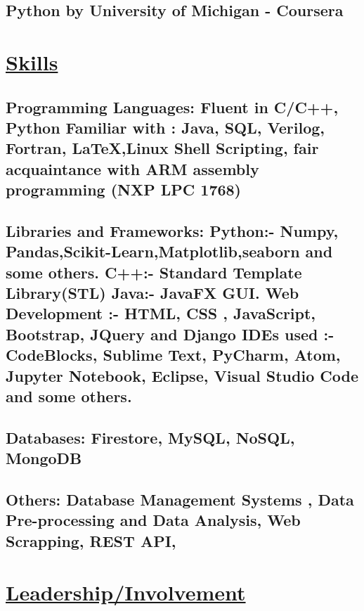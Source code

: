 \documentclass{article}
\begin{document}
    \subsection{\textbf{Python by University of Michigan}
    \textmd{- Coursera}}
    

 \section{\underline{Skills}}

    \subsection{\textbf{Programming Languages:}
    \textmd{Fluent in C/C++, Python }\newline
    \textmd{Familiar with : Java, SQL, Verilog, Fortran, {\LaTeX},Linux Shell Scripting, fair acquaintance
    with ARM assembly programming (NXP LPC 1768) } }

    \subsection{\textbf{Libraries and Frameworks:}\newline
    \textbf{Python:}\textmd{- Numpy, Pandas,Scikit-Learn,Matplotlib,seaborn and some others.}\newline
    \textbf{C++:}\textmd{- Standard Template Library(STL)}\newline
    \textbf{Java:}\textmd{- JavaFX GUI.}\newline
    \textbf{Web Development :}\textmd{- HTML, CSS , JavaScript, Bootstrap, JQuery and Django}\newline
    \textbf{IDEs used :}\textmd{- CodeBlocks, Sublime Text, PyCharm, Atom, Jupyter Notebook, Eclipse, Visual Studio Code and some others.}}
    \subsection{\textbf{Databases:}
    \textmd{Firestore, MySQL, NoSQL, MongoDB}}
    \subsection{\textbf{Others:}
    \textmd{Database Management Systems , Data Pre-processing and Data Analysis, Web Scrapping, REST API,}}




\section{\underline{Leadership/Involvement}}
\end{document}

